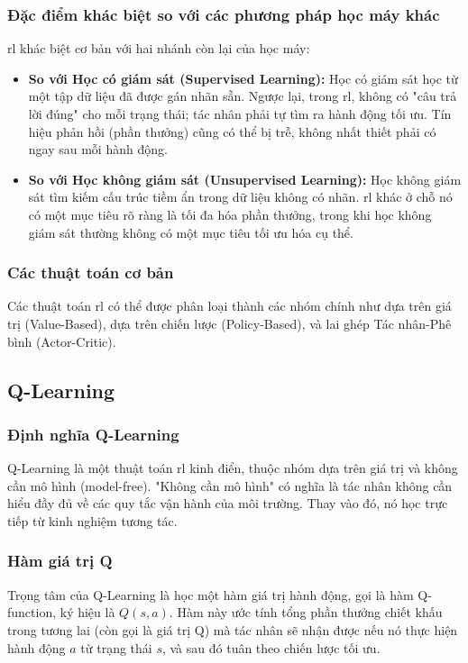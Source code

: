 \subsubsection{Đặc điểm khác biệt so với các phương pháp học máy khác}
\ac{rl} khác biệt cơ bản với hai nhánh còn lại của học máy:
\begin{itemize}
    \item \textbf{So với Học có giám sát (Supervised Learning):} Học có giám sát
        học từ một tập dữ liệu đã được gán nhãn sẵn. Ngược lại, trong \ac{rl},
        không có "câu trả lời đúng" cho mỗi trạng thái; tác nhân phải tự tìm ra hành
        động tối ưu. Tín hiệu phản hồi (phần thưởng) cũng có thể bị trễ, không nhất
        thiết phải có ngay sau mỗi hành động.

    \item \textbf{So với Học không giám sát (Unsupervised Learning):} Học không
        giám sát tìm kiếm cấu trúc tiềm ẩn trong dữ liệu không có nhãn. \ac{rl}
        khác ở chỗ nó có một mục tiêu rõ ràng là tối đa hóa phần thưởng, trong khi
        học không giám sát thường không có một mục tiêu tối ưu hóa cụ thể.
\end{itemize}

\subsubsection{Các thuật toán cơ bản}
Các thuật toán \ac{rl} có thể được phân loại thành các nhóm chính như dựa trên giá
trị (Value-Based), dựa trên chiến lược (Policy-Based), và lai ghép Tác nhân-Phê bình
(Actor-Critic).

\subsection{Q-Learning}
\subsubsection{Định nghĩa Q-Learning}
Q-Learning là một thuật toán \ac{rl} kinh điển, thuộc nhóm dựa trên giá trị và không
cần mô hình (model-free). "Không cần mô hình" có nghĩa là tác nhân không cần
hiểu đầy đủ về các quy tắc vận hành của môi trường. Thay vào đó, nó học trực
tiếp từ kinh nghiệm tương tác.

\subsubsection{Hàm giá trị Q}
Trọng tâm của Q-Learning là học một hàm giá trị hành động, gọi là hàm Q-function,
ký hiệu là $Q(s, a)$. Hàm này ước tính tổng phần thưởng chiết khấu trong tương lai
(còn gọi là giá trị Q) mà tác nhân sẽ nhận được nếu nó thực hiện hành động $a$ từ
trạng thái $s$, và sau đó tuân theo chiến lược tối ưu.

